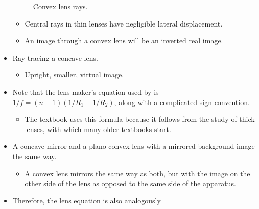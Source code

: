 \documentclass[../notes.tex]{subfiles}
\begin{document}
\begin{itemize}
\begin{figure}[h!]
        \caption{Convex lens rays.}
        \label{fig:lensRaysConvex}
    \end{figure}
    \begin{itemize}
        \item Central rays in thin lenses have negligible lateral displacement.
        \item An image through a convex lens will be an inverted real image.
    \end{itemize}
    \item {}Ray tracing a concave lens.
    \begin{itemize}
        \item Upright, smaller, virtual image.
    \end{itemize}
    \item Note that the lens maker's equation used by \textcite{bib:YoungFreedman} is $1/f=(n-1)(1/R_1-1/R_2)$, along with a complicated sign convention.
    \begin{itemize}
        \item The textbook uses this formula because it follows from the study of thick lenses, with which many older textbooks start.
    \end{itemize}
    \item A concave mirror and a plano convex lens with a mirrored background image the same way.
    \begin{itemize}
        \item A convex lens mirrors the same way as both, but with the image on the other side of the lens as opposed to the same side of the apparatus.
    \end{itemize}
    \item Therefore, the lens equation is also analogously

\end{itemize}
\end{document}
